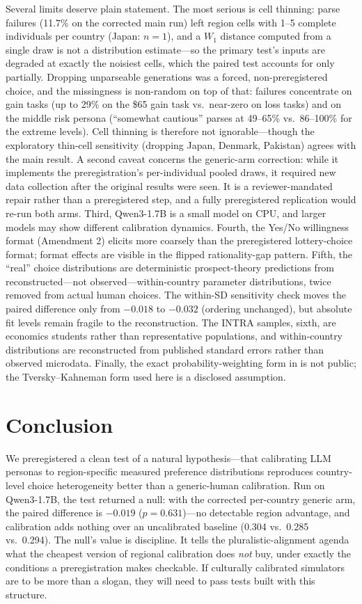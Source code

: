 \documentclass[10pt,letterpaper]{article}
\begin{document}
Several limits deserve plain statement. The most serious is cell
thinning: parse failures (11.7\% on the corrected main run) left region
cells with 1--5 complete individuals per country (Japan: $n=1$), and a
$W_1$ distance computed from a single draw is not a distribution
estimate---so the primary test's inputs are degraded at exactly the
noisiest cells, which the paired test accounts for only partially.
Dropping unparseable generations was a forced, non-preregistered choice,
and the missingness is non-random on top of that: failures concentrate on
gain tasks (up to 29\% on the \$65 gain task vs.\ near-zero on loss tasks)
and on the middle risk persona (``somewhat cautious'' parses at 49--65\%
vs.\ 86--100\% for the extreme levels). Cell thinning is therefore not
ignorable---though the exploratory thin-cell sensitivity (dropping Japan,
Denmark, Pakistan) agrees with the main result. A second caveat concerns
the generic-arm correction: while it implements the preregistration's
per-individual pooled draws, it required new data collection after the
original results were seen. It is a reviewer-mandated repair rather than a
preregistered step, and a fully preregistered replication would re-run both
arms. Third, Qwen3-1.7B is a
small model on CPU, and larger models may show different calibration
dynamics. Fourth, the Yes/No willingness format (Amendment 2) elicits more
coarsely than the preregistered lottery-choice format; format effects are
visible in the flipped rationality-gap pattern. Fifth, the ``real'' choice
distributions are deterministic prospect-theory predictions from
reconstructed---not observed---within-country parameter distributions,
twice removed from actual human choices. The within-SD sensitivity check
moves the paired difference only from $-0.018$ to $-0.032$ (ordering
unchanged), but absolute fit levels remain fragile to the reconstruction.
The INTRA samples, sixth, are economics students rather than
representative populations, and within-country distributions are
reconstructed from published standard errors rather than observed
microdata. Finally, the exact probability-weighting form in
\citet{rieger2017} is not public; the Tversky--Kahneman form used here is
a disclosed assumption.

\section{Conclusion}

We preregistered a clean test of a natural hypothesis---that calibrating
LLM personas to region-specific measured preference distributions
reproduces country-level choice heterogeneity better than a generic-human
calibration. Run on Qwen3-1.7B, the test returned a null: with the
corrected per-country generic arm, the paired difference is $-0.019$
($p=0.631$)---no detectable region advantage, and calibration adds nothing
over an uncalibrated baseline (0.304 vs.\ 0.285 vs.\ 0.294). The null's
value is discipline. It tells the pluralistic-alignment agenda what the
cheapest version of regional calibration does \textit{not} buy, under
exactly the conditions a preregistration makes checkable. If culturally
calibrated simulators are to be more than a slogan, they will need to pass
tests built with this structure.
\end{document}
